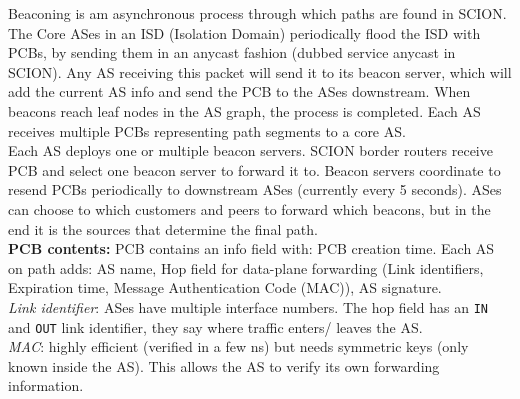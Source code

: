 \documentclass[11pt,oneside,a4paper]{article}
\begin{document}
Beaconing is am asynchronous process through which paths are found in SCION. The Core ASes in an ISD (Isolation Domain) periodically flood the ISD with PCBs, by sending them in an anycast fashion (dubbed service anycast in SCION). Any AS receiving this packet will send it to its beacon server, which will add the current AS info and send the PCB to the ASes downstream. When beacons reach leaf nodes in the AS graph, the process is completed. Each AS receives multiple PCBs representing path segments to a core AS.\\

\noindent Each AS deploys one or multiple beacon servers. SCION border routers receive PCB
and select one beacon server to forward it to. Beacon servers coordinate to resend PCBs periodically to downstream ASes (currently every 5 seconds). ASes can choose to which customers and peers to forward which beacons, but in the end it is the sources that determine the final path.\\

\noindent \textbf{PCB contents:} PCB contains an info field with: PCB creation time. Each AS on path adds: AS name, Hop field for data-plane forwarding (Link identifiers, Expiration time, Message Authentication Code (MAC)), AS signature.\\
\textit{Link identifier}: ASes have multiple interface numbers. The hop field has an \texttt{IN} and \texttt{OUT} link identifier, they say where traffic enters/ leaves the AS.\\
\textit{MAC}: highly efficient (verified in a few ns) but needs symmetric keys (only known inside the AS). This allows the AS to verify its own forwarding information.
\end{document}
